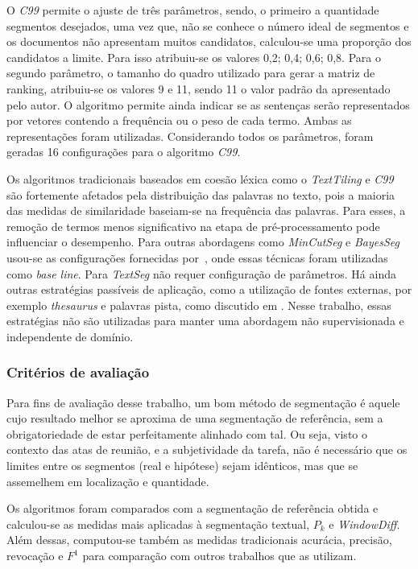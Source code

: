 O \textit{C99} permite o ajuste de três parâmetros, sendo, o primeiro a quantidade segmentos desejados, uma vez que, não se conhece o número ideal de segmentos e os documentos não apresentam muitos candidatos, calculou-se uma proporção dos candidatos a limite. Para isso atribuiu-se os valores {0,2; 0,4; 0,6; 0,8}. Para o segundo parâmetro, o tamanho do quadro utilizado para gerar a matriz de ranking, atribuiu-se os valores 9 e 11, sendo 11 o valor padrão da apresentado pelo autor. O algoritmo permite ainda indicar se as sentenças serão representados por vetores contendo a frequência ou o peso de cada termo. Ambas as representações foram utilizadas. Considerando todos os parâmetros, foram geradas 16 configurações para o algoritmo \textit{C99}.

Os algoritmos tradicionais baseados em coesão léxica como o \textit{TextTiling} e \textit{C99} são fortemente afetados pela distribuição das palavras no texto, pois a maioria das medidas de similaridade baseiam-se na frequência das palavras. Para esses, a remoção de termos menos significativo na etapa de pré-processamento pode influenciar o desempenho. Para outras abordagens como \textit{MinCutSeg} e \textit{BayesSeg} usou-se as configurações fornecidas por~\cite{Eisenstein2008}, onde essas técnicas foram utilizadas como \textit{base line}. Para \textit{TextSeg} não requer configuração de parâmetros.
Há ainda outras estratégias passíveis de aplicação, como a utilização de fontes externas, por exemplo \textit{thesaurus} e palavras pista, como discutido em \cite{Naili2016, Gutierrez2016, Ferret2009}. Nesse trabalho, essas estratégias não são utilizadas para manter uma abordagem não supervisionada e independente de domínio. 
	

\subsubsection{Critérios de avaliação}

Para fins de avaliação desse trabalho, um bom método de segmentação é aquele cujo resultado melhor se aproxima de uma segmentação de referência, sem a obrigatoriedade de estar perfeitamente alinhado com tal. Ou seja, visto o contexto das atas de reunião, e a subjetividade da tarefa, não é necessário que os limites entre os segmentos (real e hipótese) sejam idênticos, mas que se assemelhem em localização e quantidade.

Os algoritmos foram comparados com a segmentação de referência obtida e calculou-se as medidas mais aplicadas à segmentação textual, $P_k$ e \textit{WindowDiff}. Além dessas, computou-se também as medidas tradicionais acurácia, precisão, revocação e $F^1$ para comparação com outros trabalhos que as utilizam.

